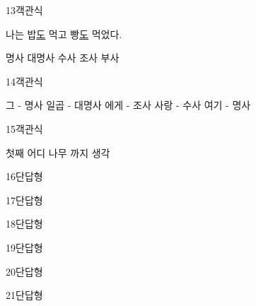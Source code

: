 \documentclass[fs9,seriesRus]{korfarm-base}
\begin{document}
\begin{kfQBlock}{13}{객관식}
\begin{kfEvidence}나는 밥\uline{도} 먹고 빵\uline{도} 먹었다.\end{kfEvidence}
\begin{kfChoices}
\kfChoice 명사
\kfChoice 대명사
\kfChoice 수사
\kfChoice 조사
\kfChoice 부사
\end{kfChoices}
\end{kfQBlock}
\begin{kfQBlock}{14}{객관식}
\begin{kfChoices}
\kfChoice 그 - 명사
\kfChoice 일곱 - 대명사
\kfChoice 에게 - 조사
\kfChoice 사랑 - 수사
\kfChoice 여기 - 명사
\end{kfChoices}
\end{kfQBlock}
\begin{kfQBlock}{15}{객관식}
\begin{kfChoices}
\kfChoice 첫째
\kfChoice 어디
\kfChoice 나무
\kfChoice 까지
\kfChoice 생각
\end{kfChoices}
\end{kfQBlock}
\begin{kfQBlock}{16}{단답형}
\end{kfQBlock}
\begin{kfQBlock}{17}{단답형}
\end{kfQBlock}
\begin{kfQBlock}{18}{단답형}
\end{kfQBlock}
\begin{kfQBlock}{19}{단답형}
\end{kfQBlock}
\begin{kfQBlock}{20}{단답형}
\end{kfQBlock}
\begin{kfQBlock}{21}{단답형}
\end{kfQBlock}
\end{document}
